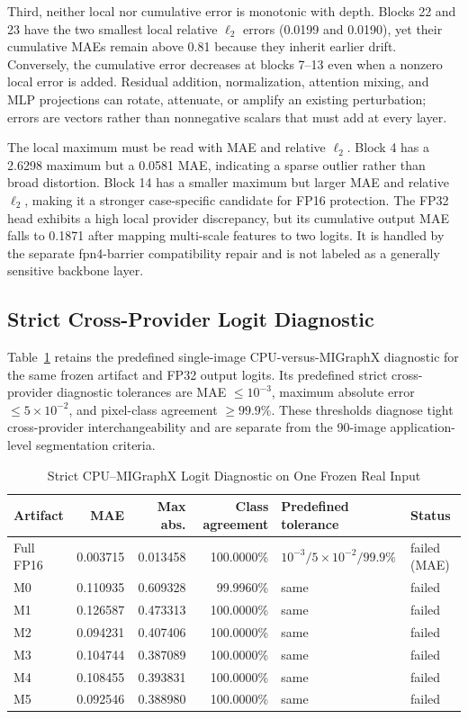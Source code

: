 \documentclass[conference]{IEEEtran}
\begin{document}
Third, neither local nor cumulative error is monotonic with depth. Blocks 22 and 23 have the two smallest local relative $\ell_2$ errors (0.0199 and 0.0190), yet their cumulative MAEs remain above 0.81 because they inherit earlier drift. Conversely, the cumulative error decreases at blocks 7--13 even when a nonzero local error is added. Residual addition, normalization, attention mixing, and MLP projections can rotate, attenuate, or amplify an existing perturbation; errors are vectors rather than nonnegative scalars that must add at every layer.

The local maximum must be read with MAE and relative $\ell_2$. Block 4 has a 2.6298 maximum but a 0.0581 MAE, indicating a sparse outlier rather than broad distortion. Block 14 has a smaller maximum but larger MAE and relative $\ell_2$, making it a stronger case-specific candidate for FP16 protection. The FP32 head exhibits a high local provider discrepancy, but its cumulative output MAE falls to 0.1871 after mapping multi-scale features to two logits. It is handled by the separate fpn4-barrier compatibility repair and is not labeled as a generally sensitive backbone layer.

\subsection{Strict Cross-Provider Logit Diagnostic}

Table~\ref{tab:strict-logits} retains the predefined single-image CPU-versus-MIGraphX diagnostic for the same frozen artifact and FP32 output logits. Its predefined strict cross-provider diagnostic tolerances are MAE $\leq10^{-3}$, maximum absolute error $\leq5\times10^{-2}$, and pixel-class agreement $\geq99.9\%$. These thresholds diagnose tight cross-provider interchangeability and are separate from the 90-image application-level segmentation criteria.

\begin{table}[t]
\caption{Strict CPU--MIGraphX Logit Diagnostic on One Frozen Real Input}
\label{tab:strict-logits}
\centering
\small
\begin{tabular}{lrrrll}
\toprule
Artifact & MAE & Max abs. & Class agreement & Predefined tolerance & Status \\
\midrule
Full FP16 & 0.003715 & 0.013458 & 100.0000\% & $10^{-3}/5\!\times\!10^{-2}/99.9\%$ & failed (MAE) \\
M0 & 0.110935 & 0.609328 & 99.9960\% & same & failed \\
M1 & 0.126587 & 0.473313 & 100.0000\% & same & failed \\
M2 & 0.094231 & 0.407406 & 100.0000\% & same & failed \\
M3 & 0.104744 & 0.387089 & 100.0000\% & same & failed \\
M4 & 0.108455 & 0.393831 & 100.0000\% & same & failed \\
M5 & 0.092546 & 0.388980 & 100.0000\% & same & failed \\
\bottomrule
\end{tabular}
\end{table}
\end{document}
